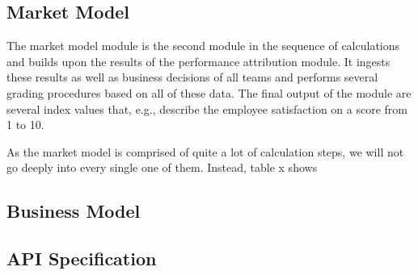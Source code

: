 \subsection{Market Model}
The market model module is the second module in the sequence of calculations and builds upon the results of the performance attribution module. It ingests these results as well as business decisions of all teams and performs several grading procedures based on all of these data. The final output of the module are several index values that, e.g., describe the employee satisfaction on a score from 1 to 10.

As the market model is comprised of quite a lot of calculation steps, we will not go deeply into every single one of them. Instead, table x shows


\subsection{Business Model}



\subsection{API Specification}
